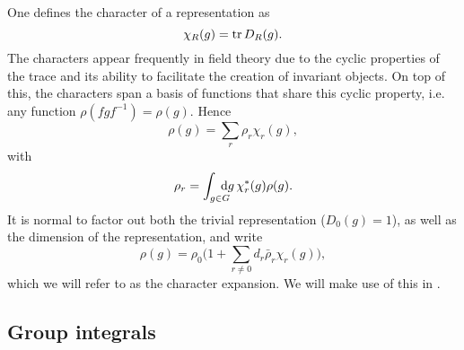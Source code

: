 One defines the character of a representation as
%
\begin{equation}
  \chi_R(g) = \operatorname{tr} D_R(g).
\end{equation}
%
The characters appear frequently in field theory due to the cyclic properties of
the trace and its ability to facilitate the creation of invariant objects. On
top of this, the characters span a basis of functions that share this cyclic
property, i.e. any function $\rho(f g f^{-1}) = \rho(g)$. Hence
%
\begin{equation}
  \rho(g) = \sum_r \rho_r \chi_r(g),
\end{equation}
%
with
\begin{equation}
  \rho_r = \int_{\mathrlap{g \in G}\hskip1.5ex} \mathrm{d}g \, \chi_r^*(g) \rho(g).
\end{equation}
%
It is normal to factor out both the trivial representation ($D_0(g) = 1$), as
well as the dimension of the representation, and write
%
\begin{equation}
  \rho(g) = \rho_0 \Big(1 + \sum_{r \neq 0} d_r \bar{\rho}_r \chi_r(g)\Big),
\end{equation}
%
which we will refer to as the character expansion. We will make use of this in
.

\subsection{Group integrals}

